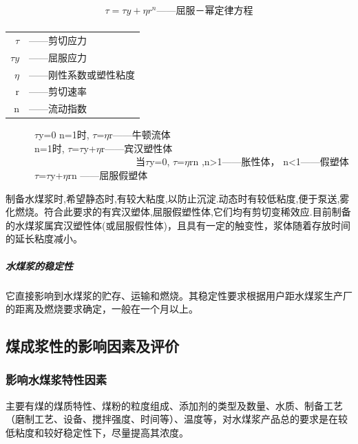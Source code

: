 \documentclass[10pt,openany]{ctexbook}
\begin{document}
\begin{equation}
\begin{split}
 \tau =\tau y +\eta r^n ——\mbox{屈服－幂定律方程}\\
\end{split}
\end{equation}

\begin{center}
\begin{tabular}{r l}

$\tau$ &  ——\mbox{剪切应力} \\

$\tau y $ & ——\mbox{屈服应力} \\

 $\eta$ & ——\mbox{刚性系数或塑性粘度} \\

 r &  ——\mbox{剪切速率} \\

n & ——\mbox{流动指数} \\


\end{tabular}
\end{center}
\begin{center}


~~~~~~$\tau$y=0 n=1时, $\tau$=$\eta$r——牛顿流体\\
~~~~~~n=1时, $\tau$=$\tau$y+$\eta$r——宾汉塑性体\\
~~~~~~~~~~~~~~~~~~~~~~~~~~~当$\tau$y=0, $\tau$=$\eta$rn ,n>1——胀性体，
                  n<1——假塑体\\
~~~~~~$\tau$=$\tau$y+$\eta$rn ——屈服假塑体
\end{center}
制备水煤浆时,希望静态时,有较大粘度,以防止沉淀.动态时有较低粘度,便于泵送,雾化燃烧。符合此要求的有宾汉塑体,屈服假塑性体,它们均有剪切变稀效应.目前制备的水煤浆属宾汉塑性体(或屈服假性体)，且具有一定的触变性，浆体随着存放时间的延长粘度减小。
\subparagraph{水煤浆的稳定性}
它直接影响到水煤浆的贮存、运输和燃烧。其稳定性要求根据用户距水煤浆生产厂的距离及燃烧要求确定，一般在一个月以上。
\subsection{煤成浆性的影响因素及评价}
\subsubsection{影响水煤浆特性因素}
主要有煤的煤质特性、煤粉的粒度组成、添加剂的类型及数量、水质、制备工艺（磨制工艺、设备、搅拌强度、时间等）、温度等，对水煤浆产品总的要求是在较低粘度和较好稳定性下，尽量提高其浓度。
\end{document}

